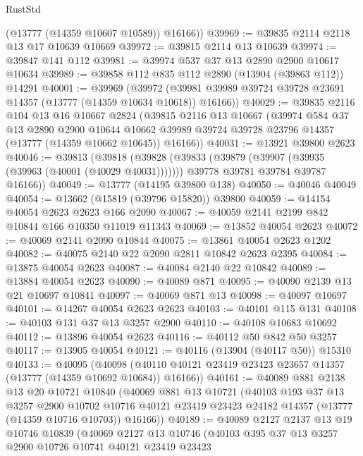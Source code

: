 \begin{lexlean}{RustStd}
\begin{coremodule}
        (@13777 (@14359 @10607 @10589))
        @16166))
@39969 := @39835 @2114 @2118 @13 @17 @10639 @10669
@39972 := @39815 @2114 @13 @10639
@39974 := @39847 @141 @112
@39981 := @39974 @537 @37 @13 @2890 @2900 @10617 @10634
@39989 := @39858 @112 @835 @112 @2890 (@13904 (@39863 @112)) @14291
@40001 := @39969
    (@39972 (@39981 @39989 @39724 @39728 @23691 @14357 (@13777 (@14359 @10634 @10618)) @16166))
@40029 := @39835
    @2116
    @104
    @13
    @16
    @10667
    @2824
    (@39815
      @2116
      @13
      @10667
      (@39974
        @584
        @37
        @13
        @2890
        @2900
        @10644
        @10662
        @39989
        @39724
        @39728
        @23796
        @14357
        (@13777 (@14359 @10662 @10645))
        @16166))
@40031 := @13921 @39800 @2623
@40046 := @39813
    (@39818
      (@39828
        (@39833 (@39879 (@39907 (@39935 (@39963 (@40001 (@40029 @40031)))))))
        @39778
        @39781
        @39784
        @39787
        @16166))
@40049 := @13777 (@14195 @39800 @138)
@40050 := @40046 @40049
@40054 := @13662 (@15819 (@39796 @15820)) @39800
@40059 := @14154 @40054 @2623 @2623 @166 @2090
@40067 := @40059 @2141 @2199 @842 @10844 @166 @10350 @11019 @11343
@40069 := @13852 @40054 @2623
@40072 := @40069 @2141 @2090 @10844
@40075 := @13861 @40054 @2623 @1202
@40082 := @40075 @2140 @22 @2090 @2811 @10842 @2623 @2395
@40084 := @13875 @40054 @2623
@40087 := @40084 @2140 @22 @10842
@40089 := @13884 @40054 @2623
@40090 := @40089 @871
@40095 := @40090 @2139 @13 @21 @10697 @10841
@40097 := @40069 @871 @13
@40098 := @40097 @10697
@40101 := @14267 @40054 @2623 @2623
@40103 := @40101 @115 @131
@40108 := @40103 @131 @37 @13 @3257 @2900
@40110 := @40108 @10683 @10692
@40112 := @13896 @40054 @2623
@40116 := @40112 @50 @842 @50 @3257
@40117 := @13905 @40054
@40121 := @40116 (@13904 (@40117 @50)) @15310
@40133 := @40095
    (@40098 (@40110 @40121 @23419 @23423 @23657 @14357 (@13777 (@14359 @10692 @10684)) @16166))
@40161 := @40089
    @881
    @2138
    @13
    @20
    @10721
    @10840
    (@40069
      @881
      @13
      @10721
      (@40103
        @193
        @37
        @13
        @3257
        @2900
        @10702
        @10716
        @40121
        @23419
        @23423
        @24182
        @14357
        (@13777 (@14359 @10716 @10703))
        @16166))
@40189 := @40089
    @2127
    @2137
    @13
    @19
    @10746
    @10839
    (@40069
      @2127
      @13
      @10746
      (@40103
        @395
        @37
        @13
        @3257
        @2900
        @10726
        @10741
        @40121
        @23419
        @23423

\end{coremodule}
\end{lexlean}
